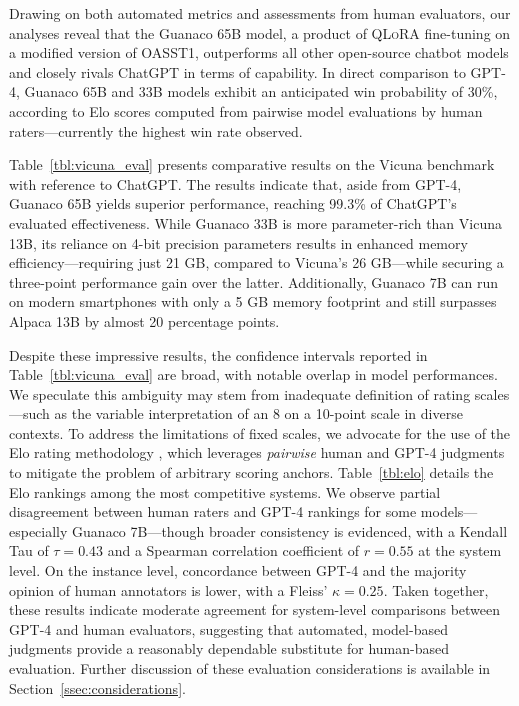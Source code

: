 Drawing on both automated metrics and assessments from human evaluators, our analyses reveal that the {Guanaco} 65B model, a product of \textsc{QLoRA} fine-tuning on a modified version of OASST1, outperforms all other open-source chatbot models and closely rivals ChatGPT in terms of capability. In direct comparison to GPT-4, {Guanaco} 65B and 33B models exhibit an anticipated win probability of 30\%, according to Elo scores computed from pairwise model evaluations by human raters—currently the highest win rate observed.

Table~\ref{tbl:vicuna_eval} presents comparative results on the Vicuna benchmark \cite{vicuna2023} with reference to ChatGPT. The results indicate that, aside from GPT-4, {Guanaco} 65B yields superior performance, reaching 99.3\% of ChatGPT’s evaluated effectiveness. While {Guanaco} 33B is more parameter-rich than Vicuna 13B, its reliance on 4-bit precision parameters results in enhanced memory efficiency—requiring just 21 GB, compared to Vicuna’s 26 GB—while securing a three-point performance gain over the latter. Additionally, {Guanaco} 7B can run on modern smartphones with only a 5 GB memory footprint and still surpasses Alpaca 13B by almost 20 percentage points.

Despite these impressive results, the confidence intervals reported in Table~\ref{tbl:vicuna_eval} are broad, with notable overlap in model performances. We speculate this ambiguity may stem from inadequate definition of rating scales—such as the variable interpretation of an 8 on a 10-point scale in diverse contexts. To address the limitations of fixed scales, we advocate for the use of the Elo rating methodology \citep{elo1967proposed}, which leverages \textit{pairwise} human and GPT-4 judgments to mitigate the problem of arbitrary scoring anchors. Table~\ref{tbl:elo} details the Elo rankings among the most competitive systems. We observe partial disagreement between human raters and GPT-4 rankings for some models—especially Guanaco 7B—though broader consistency is evidenced, with a Kendall Tau of $\tau=0.43$ and a Spearman correlation coefficient of $r=0.55$ at the system level. On the instance level, concordance between GPT-4 and the majority opinion of human annotators is lower, with a Fleiss’ $\kappa=0.25$. Taken together, these results indicate moderate agreement for system-level comparisons between GPT-4 and human evaluators, suggesting that automated, model-based judgments provide a reasonably dependable substitute for human-based evaluation. Further discussion of these evaluation considerations is available in Section~\ref{ssec:considerations}.

